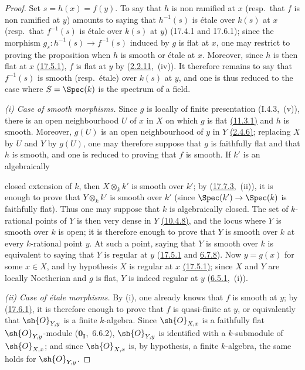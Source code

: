 \begin{proof}
Set $s=h(x)=f(y)$.
To say that $h$ is non ramified at $x$ (resp.\ that $f$ is non ramified at $y$) amounts to saying that $h^{-1}(s)$ is \'etale over $k(s)$ at $x$ (resp.\ that $f^{-1}(s)$ is \'etale over $k(s)$ at $y$) (17.4.1 and 17.6.1); since the morphism $g_s:h^{-1}(s)\to f^{-1}(s)$ induced by $g$ is flat at $x$, one may restrict to proving the proposition when $h$ is smooth or \'etale at $x$.
Moreover, since $h$ is then flat at $x$ {\hyperlink{ega4.c04.thm.17-5-1}{(17.5.1)}}, $f$ is flat at $y$ by ({\hyperlink{ega4.c04.cor.2-2-11}{2.2.11}},~(iv)).
It therefore remains to say that $f^{-1}(s)$ is smooth (resp.\ \'etale) over $k(s)$ at $y$, and one is thus reduced to the case where $S=\Spec(k)$ is the spectrum of a field.

\emph{(i) Case of smooth morphisms.}
Since $g$ is locally of finite presentation (I.4.3,~(v)), there is an open neighbourhood $U$ of $x$ in $X$ on which $g$ is flat {\hyperlink{ega4.c04.thm.11-3-1}{(11.3.1)}} and $h$ is smooth.
Moreover, $g(U)$ is an open neighbourhood of $y$ in $Y$ {\hyperlink{ega4.c04.thm.2-4-6}{(2.4.6)}}; replacing $X$ by $U$ and $Y$ by $g(U)$, one may therefore suppose that $g$ is faithfully flat and that $h$ is smooth, and one is reduced to proving that $f$ is smooth.
If $k'$ is an algebraically


closed extension of $k$, then $X\otimes_k k'$ is smooth over $k'$; by ({\hyperlink{ega4.c04.cor.17-7-3}{17.7.3}},~(ii)), it is enough to prove that $Y\otimes_k k'$ is smooth over $k'$ (since $\Spec(k')\to\Spec(k)$ is faithfully flat).
Thus one may suppose that $k$ is algebraically closed.
The set of $k$-rational points of $Y$ is then very dense in $Y$ {\hyperlink{ega4.c04.cor.10-4-8}{(10.4.8)}}, and the locus where $Y$ is smooth over $k$ is open; it is therefore enough to prove that $Y$ is smooth over $k$ at every $k$-rational point $y$.
At such a point, saying that $Y$ is smooth over $k$ is equivalent to saying that $Y$ is regular at $y$ ({\hyperlink{ega4.c04.thm.17-5-1}{17.5.1}} and {\hyperlink{ega4.c04.cor.6-7-8}{6.7.8}}).
Now $y=g(x)$ for some $x\in X$, and by hypothesis $X$ is regular at $x$ {\hyperlink{ega4.c04.thm.17-5-1}{(17.5.1)}}; since $X$ and $Y$ are locally Noetherian and $g$ is flat, $Y$ is indeed regular at $y$ ({\hyperlink{ega4.c04.prop.6-5-1}{6.5.1}},~(i)).

\emph{(ii) Case of \'etale morphisms.}
By (i), one already knows that $f$ is smooth at $y$; by {\hyperlink{ega4.c04.thm.17-6-1}{(17.6.1)}}, it is therefore enough to prove that $f$ is quasi-finite at $y$, or equivalently that $\sh{O}_{Y,y}$ is a finite $k$-algebra.
Since $\sh{O}_{X,x}$ is a faithfully flat $\sh{O}_{Y,y}$-module ($\mathbf{0}_\mathbf{I}$,~6.6.2), $\sh{O}_{Y,y}$ is identified with a $k$-submodule of $\sh{O}_{X,x}$; and since $\sh{O}_{X,x}$ is, by hypothesis, a finite $k$-algebra, the same holds for $\sh{O}_{Y,y}$.
\end{proof}

